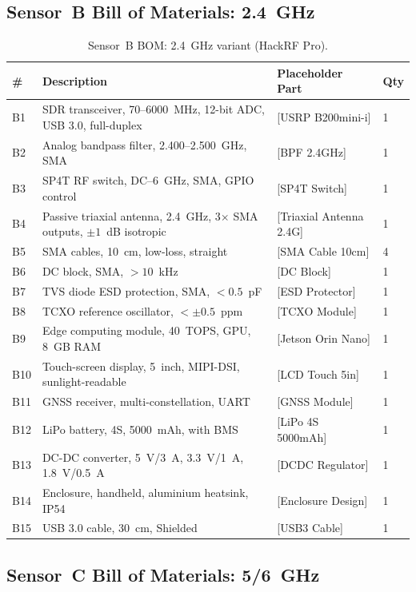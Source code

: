\documentclass[11pt,a4paper]{article}
\begin{document}
\subsection{Sensor~B Bill of Materials: 2.4~GHz}

\begin{table}[ht]
\centering
\caption{Sensor~B BOM: 2.4~GHz variant (HackRF Pro).}
\label{tab:bom_sensorB}
\small
\begin{tabular}{L{1.0cm} L{5.0cm} L{4.0cm} C{2.0cm}}
\toprule
\textbf{\#} & \textbf{Description} & \textbf{Placeholder Part} & \textbf{Qty} \\
\midrule
B1 & SDR transceiver, 70--6000~MHz, 12-bit ADC, USB 3.0, full-duplex & [USRP B200mini-i] & 1 \\
B2 & Analog bandpass filter, 2.400--2.500~GHz, SMA & [BPF 2.4GHz] & 1 \\
B3 & SP4T RF switch, DC--6~GHz, SMA, GPIO control & [SP4T Switch] & 1 \\
B4 & Passive triaxial antenna, 2.4~GHz, 3$\times$ SMA outputs, $\pm 1$~dB isotropic & [Triaxial Antenna 2.4G] & 1 \\
B5 & SMA cables, 10~cm, low-loss, straight & [SMA Cable 10cm] & 4 \\
B6 & DC block, SMA, $> 10$~kHz & [DC Block] & 1 \\
B7 & TVS diode ESD protection, SMA, $< 0.5$~pF & [ESD Protector] & 1 \\
B8 & TCXO reference oscillator, $< \pm 0.5$~ppm & [TCXO Module] & 1 \\
B9 & Edge computing module, 40~TOPS, GPU, 8~GB RAM & [Jetson Orin Nano] & 1 \\
B10 & Touch-screen display, 5~inch, MIPI-DSI, sunlight-readable & [LCD Touch 5in] & 1 \\
B11 & GNSS receiver, multi-constellation, UART & [GNSS Module] & 1 \\
B12 & LiPo battery, 4S, 5000~mAh, with BMS & [LiPo 4S 5000mAh] & 1 \\
B13 & DC-DC converter, 5~V/3~A, 3.3~V/1~A, 1.8~V/0.5~A & [DCDC Regulator] & 1 \\
B14 & Enclosure, handheld, aluminium heatsink, IP54 & [Enclosure Design] & 1 \\
B15 & USB 3.0 cable, 30~cm, Shielded & [USB3 Cable] & 1 \\
\bottomrule
\end{tabular}
\end{table}

\subsection{Sensor~C Bill of Materials: 5/6~GHz}
\end{document}
